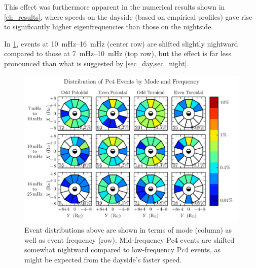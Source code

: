 This effect was furthermore apparent in the numerical results shown in
\cref{ch_results}, where \Alfven speeds on the dayside (based on empirical
profiles) gave rise to significantly higher eigenfrequencies than those on the
nightside. 

In \cref{fig_mode_f}, events at \SIrange{10}{16}{\mHz} (center row) are shifted
slightly nightward compared to those at \SIrange{7}{10}{\mHz} (top row), but
the effect is far less pronounced than what is suggested by
\cref{sec_day,sec_night}. 

\begin{figure}[!htb]
  \centering
  \includegraphics[width=\textwidth]{figures/mode_f.pdf}
  \caption[Rate of Pc4 Events by Mode and Frequency]{
    Event distributions above are shown in terms of mode (column) as well as
    event frequency (row). Mid-frequency Pc4 events are shifted somewhat
    nightward
    compared to low-frequency Pc4 events, as might be expected from the
    dayside's faster \Alfven speed. 
  }
  \label{fig_mode_f}
\end{figure}



